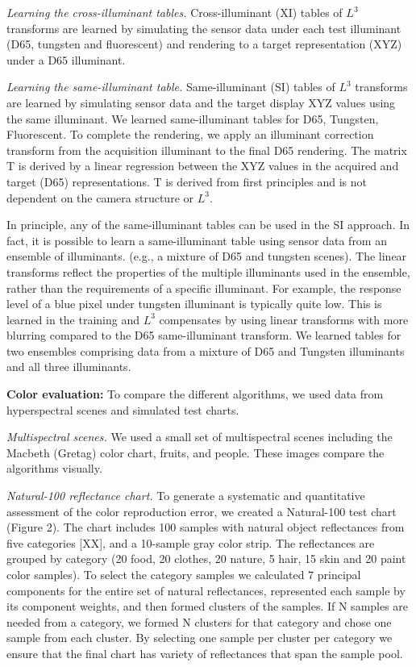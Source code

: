 \documentclass[]{spie}
\begin{document}
\textit{Learning the cross-illuminant tables.} Cross-illuminant (XI) tables of $L^3$ transforms are learned by simulating the sensor data under each test illuminant (D65, tungsten and fluorescent) and rendering to a target representation (XYZ) under a D65 illuminant. 

\textit{Learning the same-illuminant table.}  Same-illuminant (SI) tables of $L^3$ transforms are learned by simulating sensor data and the target display XYZ values using the same illuminant. We learned same-illuminant tables for D65, Tungsten, Fluorescent. To complete the rendering, we apply an illuminant correction transform from the acquisition illuminant to the final D65 rendering.  The matrix T is derived by a linear regression between the XYZ values in the acquired and target (D65) representations.  T is derived from first principles and is not dependent on the camera structure or $L^3$. 

In principle, any of the same-illuminant tables can be used in the SI approach. In fact, it is possible to learn a same-illuminant table using sensor data from an ensemble of illuminants. (e.g., a mixture of D65 and tungsten scenes). The linear transforms reflect the properties of the multiple illuminants used in the ensemble, rather than the requirements of a specific illuminant.  For example, the response level of a blue pixel under tungsten illuminant is typically quite low.  This is learned in the training and $L^3$ compensates by using linear transforms with more blurring compared to the D65 same-illuminant transform. We learned tables for two ensembles comprising data from a mixture of D65 and Tungsten illuminants and all three illuminants.

\textbf{Color evaluation:} To compare the different algorithms, we used data from hyperspectral scenes and simulated test charts.

\textit{Multispectral scenes.} We used a small set of multispectral scenes including the Macbeth (Gretag) color chart, fruits, and people.  These images compare the algorithms visually. 

\textit{Natural-100 reflectance chart.} To generate a systematic and quantitative assessment of the color reproduction error, we created a Natural-100 test chart (Figure 2). The chart includes 100 samples with natural object reflectances from five categories [XX], and a 10-sample gray color strip. The reflectances are grouped by category (20 food, 20 clothes, 20 nature, 5 hair, 15 skin and 20 paint color samples). To select the category samples we calculated 7 principal components for the entire set of natural reflectances, represented each sample by its component weights, and then formed clusters of the samples.  If N samples are needed from a category, we formed N clusters for that category and chose one sample from each cluster. By selecting one sample per cluster per category we ensure that the final chart has variety of reflectances that span the sample pool.
\end{document}
